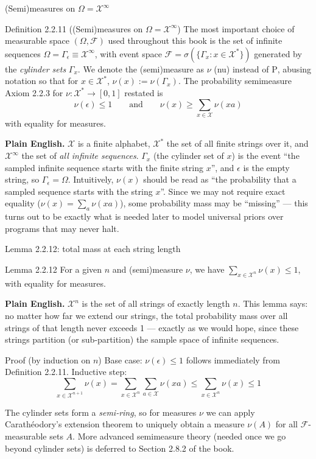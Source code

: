 \documentclass[aspectratio=169,10pt]{beamer}
\begin{document}
\begin{frame}{(Semi)measures on $\Omega=\mathcal{X}^{\infty}$}
\begin{block}{Definition 2.2.11 ((Semi)measures on $\Omega=\mathcal{X}^{\infty}$)}
The most important choice of measurable space $(\Omega,\mathcal{F})$ used
throughout this book is the set of infinite sequences
$\Omega=\Gamma_\epsilon\equiv\mathcal{X}^{\infty}$, with event space
$\mathcal{F}=\sigma(\{\Gamma_x : x\in\mathcal{X}^*\})$ generated by the
\emph{cylinder sets} $\Gamma_x$. We denote the (semi)measure as $\nu$ (nu)
instead of $\mathrm{P}$, abusing notation so that for $x\in\mathcal{X}^*$,
$\nu(x):=\nu(\Gamma_x)$. The probability semimeasure Axiom 2.2.3 for
$\nu:\mathcal{X}^*\to[0,1]$ restated is
\[ \nu(\epsilon) \leq 1 \qquad\text{and}\qquad \nu(x) \geq \sum_{x\in\mathcal{X}}\nu(xa) \]
with equality for measures.
\end{block}
\textbf{Plain English.} $\mathcal{X}$ is a finite alphabet, $\mathcal{X}^*$
the set of all finite strings over it, and $\mathcal{X}^\infty$ the set of
\emph{all infinite sequences}. $\Gamma_x$ (the cylinder set of $x$) is the
event ``the sampled infinite sequence starts with the finite string $x$'',
and $\epsilon$ is the empty string, so $\Gamma_\epsilon=\Omega$. Intuitively,
$\nu(x)$ should be read as ``the probability that a sampled sequence starts
with the string $x$''. Since we may not require exact equality
($\nu(x)=\sum_a \nu(xa)$), some probability mass may be ``missing'' --- this
turns out to be exactly what is needed later to model universal priors over
programs that may never halt.
\end{frame}

\begin{frame}{Lemma 2.2.12: total mass at each string length}
\begin{block}{Lemma 2.2.12}
For a given $n$ and (semi)measure $\nu$, we have $\sum_{x\in\mathcal{X}^n}\nu(x)\leq 1$,
with equality for measures.
\end{block}
\textbf{Plain English.} $\mathcal{X}^n$ is the set of all strings of exactly
length $n$. This lemma says: no matter how far we extend our strings, the
total probability mass over all strings of that length never exceeds 1 ---
exactly as we would hope, since these strings partition (or sub-partition)
the sample space of infinite sequences.

\begin{block}{Proof (by induction on $n$)}
Base case: $\nu(\epsilon)\leq 1$ follows immediately from Definition 2.2.11.
Inductive step:
\[ \sum_{x\in\mathcal{X}^{n+1}}\nu(x) = \sum_{x\in\mathcal{X}^n}\sum_{a\in\mathcal{X}}\nu(xa) \leq \sum_{x\in\mathcal{X}^n}\nu(x) \leq 1 \]
\end{block}
The cylinder sets form a \emph{semi-ring}, so for measures $\nu$ we can apply
Carath\'{e}odory's extension theorem to uniquely obtain a measure $\nu(A)$ for
all $\mathcal{F}$-measurable sets $A$. More advanced semimeasure theory
(needed once we go beyond cylinder sets) is deferred to Section 2.8.2 of the
book.
\end{frame}
\end{document}
